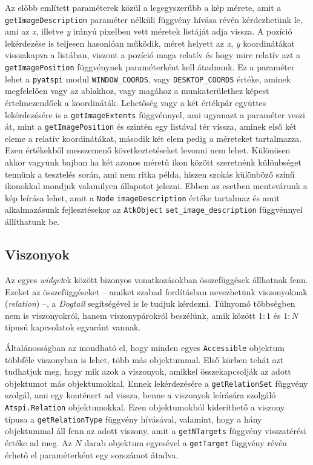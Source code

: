 Az előbb említett paraméterek közül a legegyszerűbb a kép mérete, amit a \texttt{getImageDescription} paraméter nélküli függvény hívása révén kérdezhetünk le, ami az \textit{x}, illetve \textit{y} irányú pixelben vett méretek listáját adja vissza. A pozíció lekérdezése is teljesen hasonlóan működik, méret helyett az \textit{x}, \textit{y} koordinátákat visszakapva a listában, viszont a pozíció maga relatív és hogy mire relatív azt a \texttt{getImagePosition} függvénynek paraméterként kell átadnunk. Ez a paraméter lehet a \texttt{pyatspi} modul \texttt{WINDOW\_COORDS}, vagy \texttt{DESKTOP\_COORDS} értéke, aminek megfelelően vagy az ablakhoz, vagy magához a munkaterülethez képest értelmezendőek a koordináták. Lehetőség vagy a két értékpár együttes lekérdezésére is a \texttt{getImageExtents} függvénnyel, ami ugyanazt a paraméter veszi át, mint a \texttt{getImagePosition} és szintén egy listával tér vissza, aminek első két eleme a relatív koordinátákat, második két elem pedig a méreteket tartalmazza. Ezen értékekből messzemenő következtetéseket levonni nem lehet. Különösen akkor vagyunk bajban ha két azonos méretű ikon között szeretnénk különbséget tennünk a tesztelés során, ami nem ritka példa, hiszen szokás különböző színű ikonokkal mondjuk valamilyen állapotot jelezni. Ebben az esetben mentsvárunk a kép leírása lehet, amit a \texttt{Node} \texttt{imageDescription} értéke tartalmaz és amit alkalmazásunk fejlesztésekor az \texttt{AtkObject} \texttt{set\_image\_description} függvénnyel állíthatunk be.

\subsection{Viszonyok}

Az egyes \textit{widget}ek között bizonyos vonatkozásokban összefüggések állhatnak fenn. Ezeket az összefüggéseket -- amiket szabad fordításban nevezhetünk viszonyoknak (\textit{relation}) --,  a \textit{Dogtail} segítségével is le tudjuk kérdezni. Túlnyomó többségben nem is viszonyokról, hanem viszonypárokról beszélünk, amik között $1:1$ és $1:N$ típusú kapcsolatok egyaránt vannak.

Általánosságban az mondható el, hogy minden egyes \texttt{Accessible} objektum többféle viszonyban is lehet, több más objektummal. Első körben tehát azt tudhatjuk meg, hogy mik azok a viszonyok, amikkel összekapcsolják az adott objektumot más objektumokkal. Ennek lekérdezésére a \texttt{getRelationSet} függvény szolgál, ami egy konténert ad vissza, benne a viszonyok leírására szolgáló \texttt{Atspi.Relation} objektumokkal. Ezen objektumokból kideríthető a viszony típusa a \texttt{getRelationType} függvény hívásával, valamint, hogy a hány objektummal áll fenn az adott viszony, amit a \texttt{getNTargets} függvény visszatérési értéke ad meg. Az $N$ darab objektum egyesével a \texttt{getTarget} függvény révén érhető el paraméterként egy sorszámot átadva.

